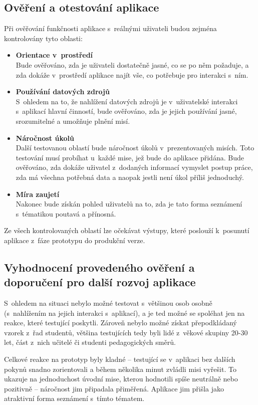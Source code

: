 \subsection{Ověření a otestování aplikace}
Při ověřování funkčnosti aplikace s~reálnými uživateli budou zejména kontrolovány tyto oblasti: 

\begin{itemize}
	\item \textbf{Orientace v~prostředí}\\
		Bude ověřováno, zda je uživateli dostatečně jasné, co se po něm požaduje, a zda dokáže v~prostředí aplikace najít vše, co potřebuje pro interakci s~ním. 
	\item \textbf{Používání datových zdrojů}\\
		S~ohledem na to, že nahlížení datových zdrojů je v~uživatelské interakci s~aplikací hlavní činností, bude ověřováno, zda je jejich používání jasné, srozumitelné a umožňuje plnění misí. 
	\item \textbf{Náročnost úkolů}\\
		Další testovanou oblastí bude náročnost úkolů v~prezentovaných misích. Toto testování musí probíhat u~každé mise, jež bude do aplikace přidána. Bude ověřováno, zda dokáže uživatel z~dodaných informací vymyslet postup práce, zda má všechna potřebná data a naopak jestli není úkol příliš jednoduchý.
	\item \textbf{Míra zaujetí}\\
		Nakonec bude získán pohled uživatelů na to, zda je tato forma seznámení s~tématikou poutavá a přínosná.
\end{itemize}

Ze všech kontrolovaných oblastí lze očekávat výstupy, které poslouží k~posunutí aplikace z~fáze prototypu do produkční verze.


\subsection{Vyhodnocení provedeného ověření a doporučení pro další rozvoj aplikace}
S~ohledem na situaci nebylo možné testovat s~většinou osob osobně (s~nahlížením na jejich interakci s~aplikací), a je ted možné se spoléhat jen na reakce, které testující poskytli. Zároveň nebylo možné získat přepodkládaný vzorek z~řad studentů, většina testujících tedy byli lidé z~věkové skupiny 20-30 let, část z~nich učitelé či studenti pedagogických směrů.

Celkové reakce na prototyp byly kladné -- testující se v~aplikaci bez dalších pokynů snadno zorientovali a během několika minut zvládli misi vyřešit. To ukazuje na jednoduchost úvodní mise, kterou hodnotili spíše neutrálně nebo pozitivně -- náročnost jim připadala přiměřená.
Aplikace jim přišla jako atraktivní forma seznámení s~tímto tématem.

